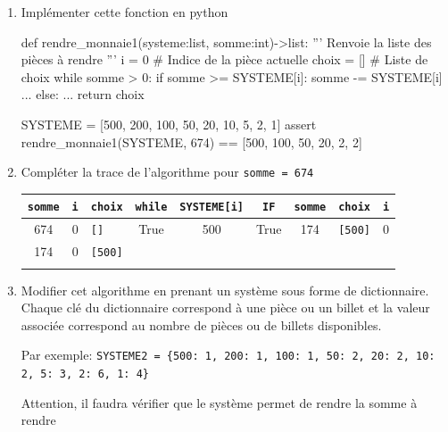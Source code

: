 \begin{exercice_cours}[]{}
\begin{enumerate}
	\item Implémenter cette fonction en python
	
	
	\begin{CodePythontexAlt}[Largeur=1\linewidth,Centre,PremLigne=1]{}
def rendre_monnaie1(systeme:list, somme:int)->list:
    ''' Renvoie la liste des pièces à rendre '''
    i = 0					# Indice de la pièce actuelle
    choix = []				# Liste de choix
    while somme > 0:
        if somme >= SYSTEME[i]:
            somme -= SYSTEME[i]
            ...
        else:
            ...
    return choix

SYSTEME = [500, 200, 100, 50, 20, 10, 5, 2, 1]
assert rendre_monnaie1(SYSTEME, 674) == [500, 100, 50, 20, 2, 2]
	
	\end{CodePythontexAlt}
	
	
\item Compléter la trace de l'algorithme pour \verb+somme = 674+

\renewcommand{\arraystretch}{1}
\begin{tabular}{|c|c|p{3.5cm}|c|c|c|c|p{3.5cm}|c|}
\hline
\verb+somme+ &
\verb+i+ &
\verb+choix+ &
\verb+while+ &
\verb+SYSTEME[i]+ &
\verb+IF+&
\verb+somme+ &
\verb+choix+ &
\verb+i+ \\ \hline
674 & 0 &\verb+[]+ &True & 500 &True & 174 & \verb+[500]+ & 0 \\ \hline 
174&0&\verb+[500]+&&&&&&\\ \hline
&&&&&&&&\\ \hline

\end{tabular}

\item Modifier cet algorithme en prenant un système sous forme de dictionnaire. Chaque clé du dictionnaire correspond à une pièce ou un billet et la valeur associée correspond au nombre de pièces ou de billets disponibles.

Par exemple: \verb+SYSTEME2 = {500: 1, 200: 1, 100: 1, 50: 2, 20: 2, 10: 2, 5: 3, 2: 6, 1: 4}+

Attention, il faudra vérifier que le système permet de rendre la somme à rendre

\end{enumerate}
\end{exercice_cours}
\medskip

